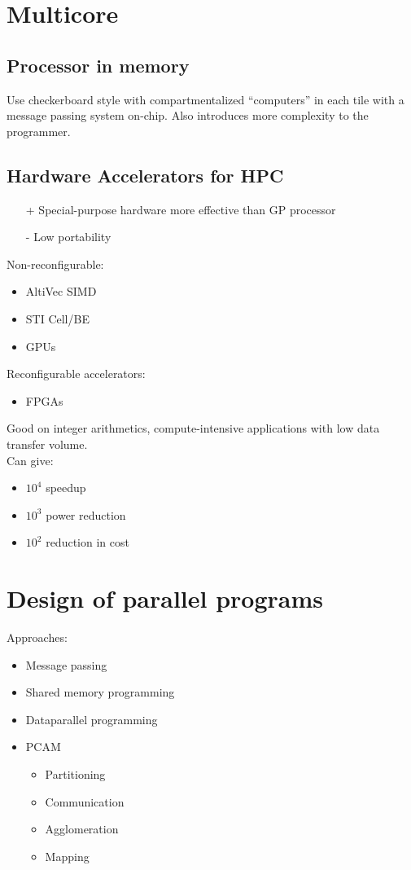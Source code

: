 \documentclass[a4paper]{article}
\begin{document}
\section{Multicore}
\subsection{Processor in memory}
Use checkerboard style with compartmentalized ``computers'' in each tile with a message
passing system on-chip. Also introduces more complexity to the programmer.

\subsection{Hardware Accelerators for HPC}
\begin{itemize}
    \item[+] Special-purpose hardware more effective than GP processor
    \item[-] Low portability
\end{itemize}
Non-reconfigurable:
\begin{itemize}
    \item AltiVec SIMD
    \item STI Cell/BE
    \item GPUs
\end{itemize}

Reconfigurable accelerators:
\begin{itemize}
    \item FPGAs
\end{itemize}
Good on integer arithmetics, compute-intensive applications with low data transfer
volume.\\
Can give:
\begin{itemize}
    \item $10^4$ speedup
    \item $10^3$ power reduction
    \item $10^2$ reduction in cost
\end{itemize}

\section{Design of parallel programs}
Approaches:
\begin{itemize}
    \item Message passing
    \item Shared memory programming
    \item Dataparallel programming
    \item PCAM
\begin{itemize}
    \item Partitioning
    \item Communication
    \item Agglomeration
    \item Mapping
\end{itemize}
\end{itemize}
\end{document}
